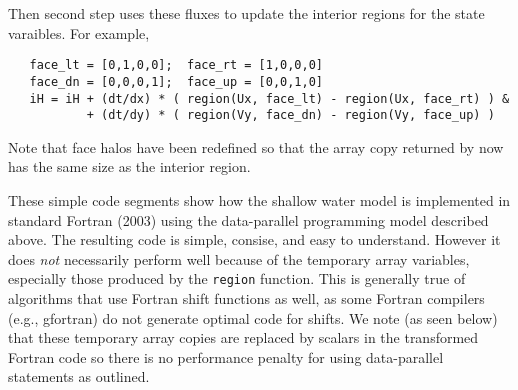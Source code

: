 Then second step uses these fluxes to update the interior regions for the state varaibles.
For example,
\begin{verbatim}
   face_lt = [0,1,0,0];  face_rt = [1,0,0,0]
   face_dn = [0,0,0,1];  face_up = [0,0,1,0]
   iH = iH + (dt/dx) * ( region(Ux, face_lt) - region(Ux, face_rt) ) &
           + (dt/dy) * ( region(Vy, face_dn) - region(Vy, face_up) )
\end{verbatim}
Note that face halos have been redefined so that the array copy returned by
now has the same size as the interior region.

These simple code segments show how the shallow water model is
implemented in standard Fortran (2003) using the data-parallel
programming model described above.  The resulting code is simple,
consise, and easy to understand.  However it does \emph{not}
necessarily perform well because of the temporary array variables,
especially those produced by the {\tt region} function.  This is
generally true of algorithms that use Fortran shift functions as well,
as some Fortran compilers (e.g., gfortran) do not generate optimal
code for shifts.  We note (as seen below) that these temporary array
copies are replaced by scalars in the transformed Fortran code so
there is no performance penalty for using data-parallel statements
as outlined.

